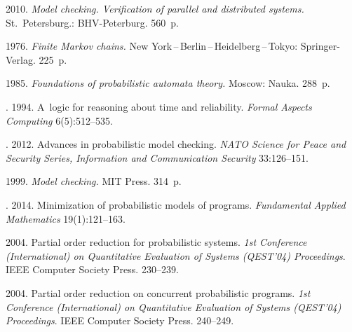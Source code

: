   \begin{multicols}{2}

\renewcommand{\bibname}{\protect\rmfamily References}



{\small\frenchspacing
 {%
 \begin{thebibliography}{99}

 \vspace*{-2pt}

 2010.
\textit{Model checking. Verification of parallel and distributed systems.}
St.\ Petersburg.: BHV-Peterburg. 560~p.


 1976.
\textit{Finite Markov chains.}
New York\,--\,Berlin\,--\,Heidelberg\,--\,Tokyo: Springer-Verlag.
225~p.

 1985.
\textit{Foundations of probabilistic automata theory.}
Moscow: Nauka. 288~p.



.
1994. A~logic for reasoning about time and reliability.
\textit{Formal Aspects Computing} 6(5):512--535.

. 2012.
Advances in probabilistic model checking.
\textit{NATO Science for Peace and Security Series,
Information and Communication Security} 33:126--151.

1999. \textit{Model checking.} MIT Press. 314~p.

.
2014. Minimization of probabilistic models of programs.
\textit{Fundamental Applied Mathematics} 19(1):121--163.

2004.
Partial order reduction for probabilistic systems.
\textit{1st Conference (International) on Quantitative
Evaluation of Systems (QEST'04) Proceedings}.
IEEE Computer Society Press. 230--239.

2004.
Partial order reduction on
concurrent probabilistic programs.
\textit{1st Conference (International) on Quantitative
Evaluation of Systems (QEST'04) Proceedings}.
IEEE Computer Society Press. 240--249.


\end{thebibliography}}}
\end{multicols}
